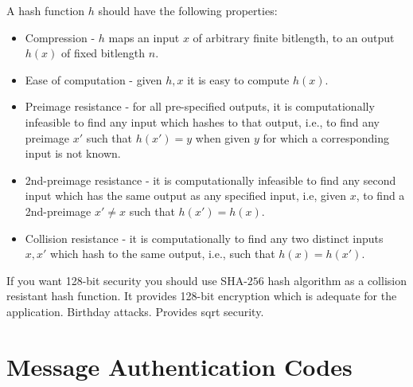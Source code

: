 	A hash function $h$ should have the following properties:
	\begin{itemize}
		\item Compression - $h$ maps an input $x$ of arbitrary finite bitlength, to an output $h(x)$ of fixed bitlength $n$.
		\item Ease of computation - given $h,x$ it is easy to compute $h(x)$.
		\item Preimage resistance - for all pre-specified outputs, it is computationally infeasible to find any input which hashes to that output, i.e., to find any preimage $x'$ such that $h(x') = y$ when given $y$ for which a corresponding input is not known.
		\item 2nd-preimage resistance - it is computationally infeasible to find any second input which has the same output as any specified input, i.e, given $x$, to find a 2nd-preimage $x' \neq x$ such that $h(x') = h(x)$.
		\item Collision resistance - it is computationally to find any two distinct inputs $x,x'$ which hash to the same output, i.e., such that $h(x) = h(x')$.
	\end{itemize} 

	If you want 128-bit security you should use SHA-$256$\cite{SHA256} hash algorithm as a collision resistant hash function.
	It provides 128-bit encryption which is adequate for the application.
	Birthday attacks.
	Provides sqrt security.

\section{Message Authentication Codes}


